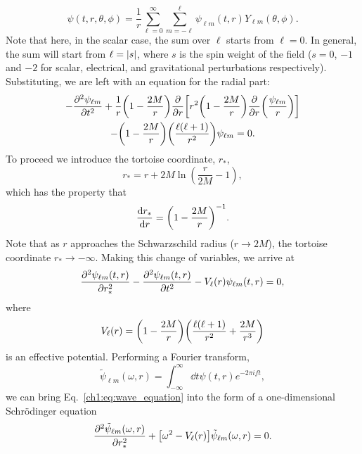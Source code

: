 \begin{equation}
    \psi(t, r, \theta, \phi) = \frac{1}{r} \sum_{\ell = 0}^\infty \sum_{m = -\ell}^\ell \psi_{\ell m}(t, r) Y_{\ell m}(\theta, \phi).
\end{equation}
Note that here, in the scalar case, the sum over $\ell$ starts from $\ell = 0$.
In general, the sum will start from $\ell = \abs{s}$, where $s$ is the spin weight of the field ($s=0$, $-1$ and $-2$ for scalar, electrical, and gravitational perturbations respectively).
Substituting, we are left with an equation for the radial part:
\begin{multline}
    - \pdv[2]{\psi_{\ell m}}{t} + \frac{1}{r} \qty(1 - \frac{2M}{r}) \pdv{r} \qty[r^2 \qty(1 - \frac{2M}{r}) \pdv{r}\qty(\frac{\psi_{\ell m}}{r}) ]\\
    - \qty(1 - \frac{2M}{r}) \qty(\frac{\ell (\ell + 1)}{r^2}) \psi_{\ell m} = 0.
\end{multline}
To proceed we introduce the tortoise coordinate, $r_*$,
\begin{equation}
    r_* = r + 2M \ln(\frac{r}{2M} - 1),
\end{equation}
which has the property that
\begin{equation}
    \dv{r_*}{r} = \qty( 1 - \frac{2M}{r} )^{-1}.
\end{equation}
Note that as $r$ approaches the Schwarzschild radius ($r \rightarrow 2M$), the tortoise coordinate $r_* \rightarrow -\infty$.
Making this change of variables, we arrive at
\begin{equation}\label{ch1:eq:wave_equation}
    \pdv[2]{\psi_{\ell m}(t,r)}{r_*} - \pdv[2]{\psi_{\ell m}(t,r)}{t} - V_\ell(r) \psi_{\ell m}(t,r) = 0,
\end{equation}
where
\begin{equation}
    V_\ell(r) = \qty( 1 - \frac{2M}{r} ) \qty( \frac{\ell (\ell + 1)}{r^2} + \frac{2M}{r^3} )
\end{equation}
is an effective potential.
Performing a Fourier transform, 
\begin{equation}\label{ch1:eq:ft}
    \tilde{\psi}_{\ell m}(\omega,r) = \int_{-\infty}^\infty \dd{t} \psi(t,r) e^{-2\pi i f t},
\end{equation}
we can bring Eq.~\ref{ch1:eq:wave_equation} into the form of a one-dimensional Schr\"{o}dinger equation
\begin{equation}\label{ch1:eq:fd_wave_equation}
    \pdv[2]{\tilde{\psi}_{\ell m}(\omega,r)}{r_*} + \qty[ \omega^2 - V_\ell(r)] \tilde{\psi}_{\ell m}(\omega,r) = 0.
\end{equation}
